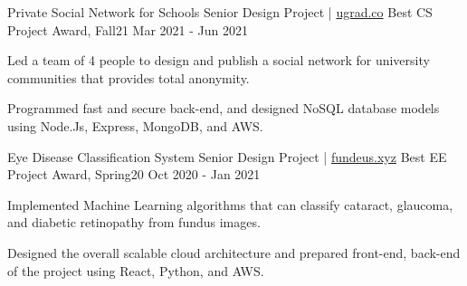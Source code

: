 
\begin{cventries}
\cvopenentry
   {Private Social Network for Schools} %
    {Senior Design Project | \href{https://ugrad.co}{ugrad.co}} %
    {Best CS Project Award, Fall21} %
    {Mar 2021 - Jun 2021} %
    {
      \begin{cvitems} %
        \item {Led a team of 4 people to design and publish a social network for university communities that provides total anonymity.}
        \item {Programmed fast and secure back-end, and designed NoSQL database models using Node.Js, Express, MongoDB, and AWS.}
      \end{cvitems}
    }
\cvopenentry
   {Eye Disease Classification System} %
    {Senior Design Project | \href{https://fundeus.xyz}{fundeus.xyz}} %
    {Best EE Project Award, Spring20} %
    {Oct 2020 - Jan 2021} %
    {
      \begin{cvitems} %
      	\item {Implemented Machine Learning algorithms that can classify cataract, glaucoma, and diabetic retinopathy from fundus images.}
      	\item {Designed the overall scalable cloud architecture and prepared front-end, back-end of the project using React, Python, and AWS.}
      \end{cvitems}
    }
\end{cventries}
